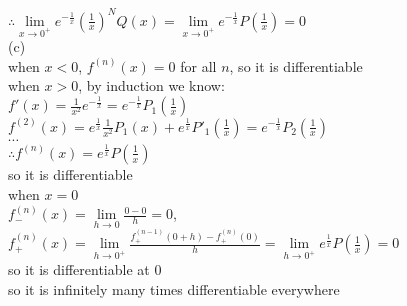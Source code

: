 \documentclass{article}
\begin{document}
$\therefore$\qquad$\lim \limits_{x \to 0^+}e^{-\frac{1}{x}}\left(\frac{1}{x}\right)^NQ(x)=\lim \limits_{x \to 0^+}e^{-\frac{1}{x}}P(\displaystyle\frac{1}{x})=0$\\

(c)\\

when $x<0$, $f^{(n)}(x)=0$ for all $n$, so it is differentiable\\

when $x>0$, by induction we know:\\

$\displaystyle f'(x)=\frac{1}{x^2}e^{-\frac{1}{x}}=e^{-\frac{1}{x}}P_1(\frac{1}{x})$\\

$\displaystyle f^{(2)}(x)=e^{\frac{1}{x}}\frac{1}{x^2}P_1(x)+e^{\frac{1}{x}}P'_1(\frac{1}{x})=e^{-\frac{1}{x}}P_2(\frac{1}{x})$\\

$\cdots$\\

$\therefore$\qquad$\displaystyle f^{(n)}(x)=e^{\frac{1}{x}}P(\frac{1}{x})$\\

so it is differentiable\\

when $x=0$\\

$f^{(n)}_-(x)=\lim \limits_{h \to 0}\displaystyle\frac{0-0}{h}=0$, $f^{(n)}_+(x)=\lim \limits_{h \to 0^+}\frac{f^{(n-1)}_+(0+h)-f^{(n)}_+(0)}{h}=\lim \limits_{h \to 0^+}e^{\frac{1}{x}}P(\frac{1}{x})=0$\\

so it is differentiable at $0$\\

so it is inﬁnitely many times differentiable everywhere\\
\end{document}

